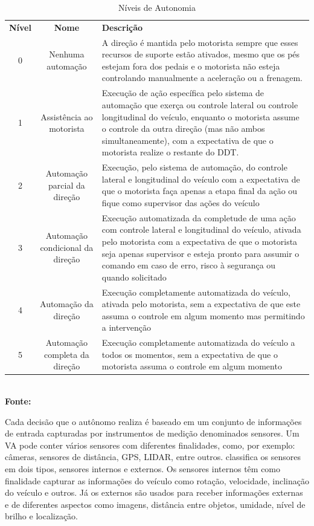 \documentclass[a4paper,12pt,Times]{article}
\begin{document}
\begin{table}[H]
\centering
\small %
\caption{Níveis de Autonomia}
\label{tab:TabelaNAD}
\begin{tabularx}{\linewidth}{|c|c|X|} \hline
\multirow{2}{*}{\textbf{Nível}} & \multirow{2}{*}{\textbf{Nome}} & \multirow{2}{*}{\textbf{Descrição}} \\ & & \\ \hline
0 & Nenhuma automação & A direção é mantida pelo motorista sempre que esses recursos de suporte estão ativados, mesmo que os pés estejam fora dos pedais e o motorista não esteja controlando manualmente a aceleração ou a frenagem. \\ \hline 
1 & Assistência ao motorista & Execução de ação específica pelo sistema de automação que exerça ou controle lateral ou controle longitudinal do veículo, enquanto o motorista assume o controle da outra direção (mas não ambos simultaneamente), com a expectativa de que o motorista realize o restante do DDT. \\ \hline 
2 & Automação parcial da direção & Execução, pelo sistema de automação, do controle lateral e longitudinal do veículo com a expectativa de que o motorista faça apenas a etapa final da ação ou fique como supervisor das ações do veículo \\ \hline 
3 & Automação condicional da direção & Execução automatizada da completude de uma ação com controle lateral e longitudinal do veículo, ativada pelo motorista com a expectativa de que o motorista seja apenas supervisor e esteja pronto para assumir o comando em caso de erro, risco à segurança ou quando solicitado \\ \hline 
4 & Automação da direção & Execução completamente automatizada do veículo, ativada pelo motorista, sem a expectativa de que este assuma o controle em algum momento mas permitindo a intervenção \\ \hline 
5 & Automação completa da direção & Execução completamente automatizada do veículo a todos os momentos, sem a expectativa de que o motorista assuma o controle em algum momento \\ \hline
\end{tabularx}
\\\textbf{\footnotesize Fonte: }

\end{table}
 
Cada decisão que o autônomo realiza é baseado em um conjunto de informações de entrada capturadas por instrumentos de medição denominados sensores. Um VA pode conter vários sensores com diferentes finalidades, como, por exemplo: câmeras, sensores de distância, GPS, LIDAR, entre outros.  classifica os sensores em dois tipos, sensores internos e externos. Os sensores internos têm como finalidade capturar as informações do veículo como rotação, velocidade, inclinação do veículo e outros. Já os externos são usados para receber informações externas e de diferentes aspectos como imagens, distância entre objetos, umidade, nível de brilho e localização. 
\end{document}
